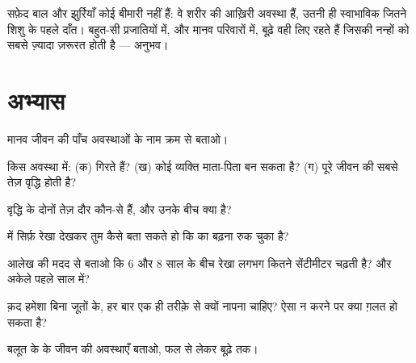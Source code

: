 \begin{remark}[बुढ़ापा एक अवस्था है, कोई ख़राबी नहीं]\label{rem:g3:stages-of-life:oldage}
सफ़ेद बाल और झुर्रियाँ कोई बीमारी नहीं हैं: वे शरीर की आख़िरी अवस्था
हैं, उतनी ही स्वाभाविक जितने शिशु के पहले दाँत। बहुत-सी प्रजातियों में,
और मानव परिवारों में, बूढ़े वही लिए रहते हैं जिसकी नन्हों को सबसे
ज़्यादा ज़रूरत होती है --- अनुभव।
\end{remark}

\section{अभ्यास}

\begin{exercise}[$\star$]\label{exo:g3:stages-of-life:1}
मानव जीवन की पाँच अवस्थाओं के नाम क्रम से बताओ।
\end{exercise}

\begin{exercise}[$\star$]\label{exo:g3:stages-of-life:2}
किस अवस्था में: (क)  गिरते हैं? (ख) कोई व्यक्ति माता-पिता
बन सकता है? (ग) पूरे जीवन की सबसे तेज़ वृद्धि होती है?
\end{exercise}

\begin{exercise}[$\star$]\label{exo:g3:stages-of-life:3}
वृद्धि के दोनों तेज़ दौर कौन-से हैं, और उनके बीच क्या है?
\end{exercise}

\begin{exercise}[$\star$]\label{exo:g3:stages-of-life:4}
 में सिर्फ़ रेखा देखकर तुम कैसे बता सकते हो कि  का
बढ़ना रुक चुका है?
\end{exercise}

\begin{exercise}[$\star$]\label{exo:g3:stages-of-life:5}
आलेख की मदद से बताओ कि $6$ और $8$ साल के बीच रेखा लगभग कितने सेंटीमीटर
चढ़ती है? और अकेले पहले साल में?
\end{exercise}

\begin{exercise}[$\star$]\label{exo:g3:stages-of-life:6}
क़द हमेशा बिना जूतों के, हर बार एक ही तरीक़े से क्यों नापना चाहिए? ऐसा
न करने पर क्या ग़लत हो सकता है?
\end{exercise}

\begin{exercise}[$\star$]\label{exo:g3:stages-of-life:7}
बलूत के  के जीवन की अवस्थाएँ बताओ, फल से लेकर बूढ़े  तक।
\end{exercise}

